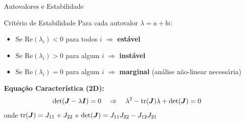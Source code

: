 \begin{frame}[allowframebreaks]{Autovalores e Estabilidade}

\vspace{0.3cm}

\begin{block}{Critério de Estabilidade}
Para cada autovalor $\lambda = a + bi$:
\begin{itemize}
    \item Se $\text{Re}(\lambda_i) < 0$ para todos $i$ $\Rightarrow$ \textbf{estável}
    \item Se $\text{Re}(\lambda_i) > 0$ para algum $i$ $\Rightarrow$ \textbf{instável}
    \item Se $\text{Re}(\lambda_i) = 0$ para algum $i$ $\Rightarrow$ \textbf{marginal} (análise não-linear necessária)
\end{itemize}
\end{block}

\vspace{0.3cm}

\textbf{Equação Característica (2D):}
\begin{equation*}
\det(\boldsymbol{J} - \lambda \boldsymbol{I}) = 0 \quad \Rightarrow \quad \lambda^2 - \text{tr}(\boldsymbol{J})\lambda + \det(\boldsymbol{J}) = 0
\end{equation*}
onde $\text{tr}(\boldsymbol{J}) = J_{11} + J_{22}$ e $\det(\boldsymbol{J}) = J_{11}J_{22} - J_{12}J_{21}$
\end{frame}

